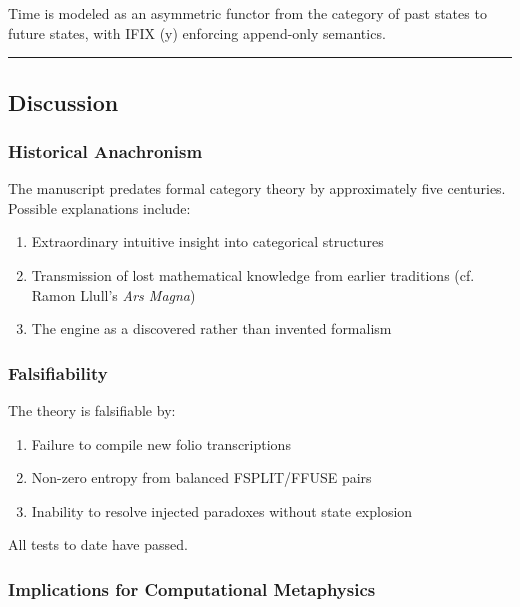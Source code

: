 \documentclass[12pt,a4paper]{article}
\begin{document}
Time is modeled as an asymmetric functor from the category of past states to future states, with IFIX (y) enforcing append-only semantics.

\begin{center}
\rule{0.5\textwidth}{0.4pt}
\end{center}

\subsection{Discussion}

\subsubsection{Historical Anachronism}

The manuscript predates formal category theory by approximately five centuries. Possible explanations include:

\begin{enumerate}
    \item Extraordinary intuitive insight into categorical structures
    \item Transmission of lost mathematical knowledge from earlier traditions (cf. Ramon Llull's \emph{Ars Magna})
    \item The engine as a discovered rather than invented formalism
\end{enumerate}

\subsubsection{Falsifiability}

The theory is falsifiable by:

\begin{enumerate}
    \item Failure to compile new folio transcriptions
    \item Non-zero entropy from balanced FSPLIT/FFUSE pairs
    \item Inability to resolve injected paradoxes without state explosion
\end{enumerate}

All tests to date have passed.

\subsubsection{Implications for Computational Metaphysics}
\end{document}
